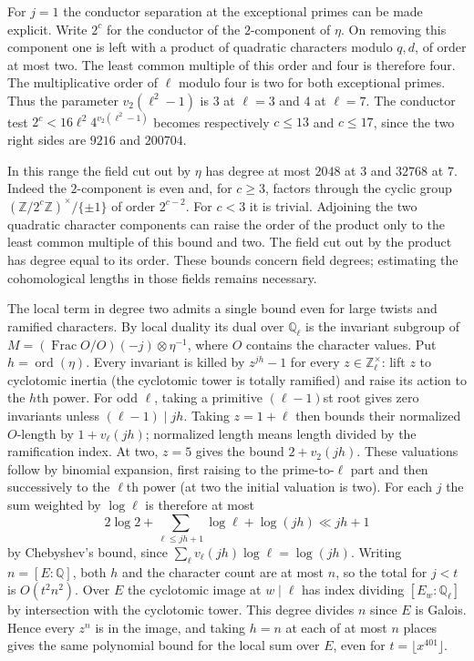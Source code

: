 \documentclass[11pt]{amsart}
\theoremstyle{definition}
\theoremstyle{remark}
\begin{document}
For $j=1$ the conductor separation at the exceptional primes can be
made explicit. Write $2^c$ for the conductor of the $2$-component
of $\eta$. On removing this component one is left with a product of
quadratic characters modulo $q,d$, of order at most two. The least
common multiple of this order and four is therefore four. The
multiplicative order of $\ell$ modulo four is two for both exceptional
primes. Thus the parameter $v_2(\ell^2-1)$ is $3$ at $\ell=3$ and
$4$ at $\ell=7$. The conductor test
$2^c<16\ell^2 4^{v_2(\ell^2-1)}$ becomes respectively
$c\le13$ and $c\le17$, since the two right sides are $9216$ and
$200704$.

In this range the field cut out by $\eta$ has degree at most $2048$
at $3$ and $32768$ at $7$. Indeed the $2$-component is even and, for
$c\ge3$, factors through the cyclic group
$(\mathbb Z/2^c\mathbb Z)^\times/\{\pm1\}$ of order $2^{c-2}$.
For $c<3$ it is trivial. Adjoining the two quadratic character
components can raise the order of the product only to the least common
multiple of this bound and two. The field cut out by the product has
degree equal to its order. These bounds concern field degrees;
estimating the cohomological lengths in those fields remains necessary.

The local term in degree two admits a single bound even for large
twists and ramified characters. By local duality its dual over
$\mathbb Q_\ell$ is the invariant subgroup of
$M=(\operatorname{Frac}O/O)(-j)\otimes\eta^{-1}$, where $O$
contains the character values. Put $h=\operatorname{ord}(\eta)$.
Every invariant is killed by $z^{jh}-1$ for every
$z\in\mathbb Z_\ell^\times$: lift $z$ to cyclotomic inertia
(the cyclotomic tower is totally ramified) and raise its action
to the $h$th power. For odd $\ell$, taking a primitive
$(\ell-1)$st root gives zero invariants unless $(\ell-1)\mid jh$.
Taking $z=1+\ell$ then bounds their normalized $O$-length by
$1+v_\ell(jh)$; normalized length means length divided by the
ramification index. At two, $z=5$ gives the bound $2+v_2(jh)$.
These valuations follow by binomial expansion, first raising to
the prime-to-$\ell$ part and then successively to the $\ell$th
power (at two the initial valuation is two).
For each $j$ the sum weighted by $\log\ell$ is therefore at most
\[
 2\log 2+\sum_{\ell\le jh+1}\log\ell+\log(jh)
 \ll jh+1
\]
by Chebyshev's bound, since $\sum_\ell v_\ell(jh)\log\ell=\log(jh)$.
Writing $n=[E:\mathbb Q]$, both $h$ and the character count are
at most $n$, so the total for $j<t$ is $O(t^2n^2)$. Over $E$ the
cyclotomic image at $w\mid\ell$ has index dividing
$[E_w:\mathbb Q_\ell]$ by intersection with the cyclotomic tower.
This degree divides $n$ since $E$ is Galois. Hence every $z^n$ is
in the image, and taking $h=n$ at each of at most $n$ places gives
the same polynomial bound for the local sum over $E$, even for
$t=\lfloor x^{401}\rfloor$.
\end{document}
